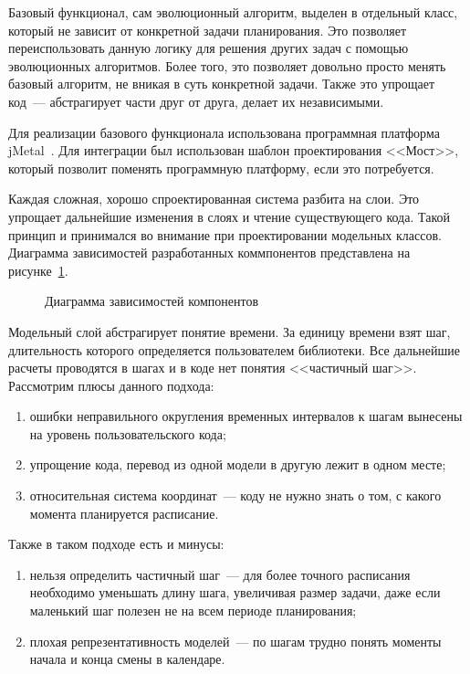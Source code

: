 \documentclass[times,specification,annotation]{itmo-student-thesis}
\begin{document}
Базовый функционал, сам эволюционный алгоритм, выделен в отдельный класс, который не зависит от конкретной задачи планирования.
Это позволяет переиспользовать данную логику для решения других задач с помощью эволюционных алгоритмов.
Более того, это позволяет довольно просто менять базовый алгоритм, не вникая в суть конкретной задачи.
Также это упрощает код~--- абстрагирует части друг от друга, делает их независимыми.

Для реализации базового функционала использована программная платформа jMetal~\cite{durillo2006jmetal}.
Для интеграции был использован шаблон проектирования <<Мост>>, который позволит поменять программную платформу, если это потребуется.

Каждая сложная, хорошо спроектированная система разбита на слои.
Это упрощает дальнейшие изменения в слоях и чтение существующего кода.
Такой принцип и принимался во внимание при проектировании модельных классов.
Диаграмма зависимостей разработанных коммпонентов представлена на рисунке~\ref{fig2:architecture_diagram}.

\begin{figure}
\caption{Диаграмма зависимостей компонентов}\label{fig2:architecture_diagram}
\centering

\end{figure}

Модельный слой абстрагирует понятие времени.
За единицу времени взят шаг, длительность которого определяется пользователем библиотеки.
Все дальнейшие расчеты проводятся в шагах и в коде нет понятия <<частичный шаг>>.
Рассмотрим плюсы данного подхода:

\begin{enumerate}
    \item ошибки неправильного округления временных интервалов к шагам вынесены на уровень пользовательского кода;
    \item упрощение кода, перевод из одной модели в другую лежит в одном месте;
    \item относительная система координат~--- коду не нужно знать о том, с какого момента планируется расписание.
\end{enumerate}

Также в таком подходе есть и минусы:

\begin{enumerate}
    \item нельзя определить частичный шаг~--- для более точного расписания необходимо уменьшать длину шага, увеличивая размер задачи, даже если маленький шаг полезен не на всем периоде планирования;
    \item плохая репрезентативность моделей~--- по шагам трудно понять моменты начала и конца смены в календаре.
\end{enumerate}
\end{document}
